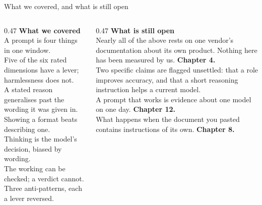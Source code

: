 \documentclass[aspectratio=169,11pt]{beamer}
\begin{document}
\begin{frame}{What we covered, and what is still open}
  \begin{columns}[T]
    \begin{column}{0.47\textwidth}
      {\bfseries What we covered}\\[0.5em]
      {\footnotesize
      A prompt is four things in one window.\\[0.35em]
      Five of the six rated dimensions have a lever; harmlessness does not.\\[0.35em]
      A stated reason generalises past the wording it was given in.\\[0.35em]
      Showing a format beats describing one.\\[0.35em]
      Thinking is the model's decision, biased by wording.\\[0.35em]
      The working can be checked; a verdict cannot.\\[0.35em]
      Three anti-patterns, each a lever reversed.}
    \end{column}
    \begin{column}{0.47\textwidth}
      {\bfseries What is still open}\\[0.5em]
      {\footnotesize
      Nearly all of the above rests on one vendor's documentation about its own product. Nothing
      here has been measured by us. \textbf{Chapter 4.}\\[0.5em]
      Two specific claims are flagged unsettled: that a role improves accuracy, and that a
      short reasoning instruction helps a current model.\\[0.5em]
      A prompt that works is evidence about one model on one day. \textbf{Chapter 12.}\\[0.5em]
      What happens when the document you pasted contains instructions of its own.
      \textbf{Chapter 8.}}
    \end{column}
  \end{columns}
\end{frame}
\end{document}
